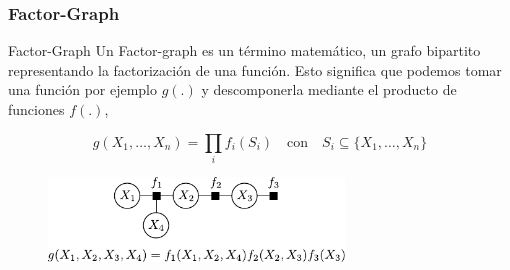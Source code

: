 \begin{frame}
    \frametitle{Factor-Graph}
    
    \begin{block}{Factor-Graph}
        Un Factor-graph es un término matemático, un grafo bipartito representando la factorización de una función. Esto significa que podemos tomar una función por ejemplo $g(.)$ y descomponerla mediante el producto de funciones $f(.)$,
        
        \begin{equation*}
            g(X_{1}, \dots, X_{n}) = \prod_{i} f_{i}(S_{i}) \quad \text{con} \quad S_{i}     \subseteq \{ X_{1},\dots, X_{n} \}
        \end{equation*}
    \end{block}

    \begin{figure}[!h]
        \includegraphics[width=0.7\textwidth]{images/factor_graph_example.pdf}
    \end{figure}

    
\end{frame}



